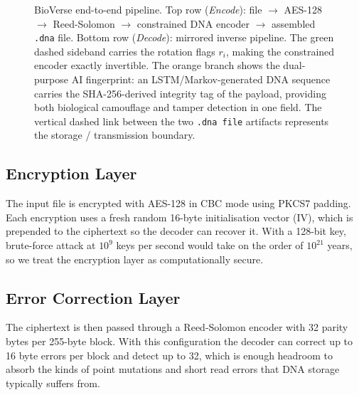 \documentclass[conference]{IEEEtran}
\begin{document}
\begin{figure}[t]
\caption{BioVerse end-to-end pipeline. Top row (\emph{Encode}): file $\to$ AES-128 $\to$ Reed-Solomon $\to$ constrained DNA encoder $\to$ assembled \texttt{.dna} file. Bottom row (\emph{Decode}): mirrored inverse pipeline. The green dashed sideband carries the rotation flags $r_i$, making the constrained encoder exactly invertible. The orange branch shows the dual-purpose AI fingerprint: an LSTM/Markov-generated DNA sequence carries the SHA-256-derived integrity tag of the payload, providing both biological camouflage and tamper detection in one field. The vertical dashed link between the two \texttt{.dna~file} artifacts represents the storage / transmission boundary.}
\label{fig:pipeline}
\end{figure}

\subsection{Encryption Layer}

The input file is encrypted with AES-128 in CBC mode using PKCS7 padding. Each encryption uses a fresh random 16-byte initialisation vector (IV), which is prepended to the ciphertext so the decoder can recover it. With a 128-bit key, brute-force attack at $10^9$ keys per second would take on the order of $10^{21}$ years, so we treat the encryption layer as computationally secure.

\subsection{Error Correction Layer}

The ciphertext is then passed through a Reed-Solomon encoder with 32 parity bytes per 255-byte block. With this configuration the decoder can correct up to 16 byte errors per block and detect up to 32, which is enough headroom to absorb the kinds of point mutations and short read errors that DNA storage typically suffers from.
\end{document}

